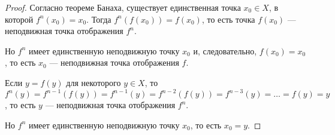 \documentclass[a4paper]{article}
\begin{document}
\begin{proof}
Согласно теореме Банаха, существует единственная точка $x_0 \in X$,
в которой $f^n(x_0) = x_0$. Тогда $f^n(f(x_0)) = f(x_0)$, то есть
точка $f(x_0)$ --- неподвижная точка отображения $f^n$.

Но $f^n$ имеет единственную неподвижную точку $x_0$ и,
следовательно, $f(x_0)=x_0$, то есть $x_0$ --- неподвижная точка
отображения $f$.

Если $y=f(y)$ для некоторого $y\in X$, то $f^n(y) = f^{n-1}(f(y)) =
f^{n-1}(y) = f^{n-2}(f(y)) = f^{n-3}(y) = \ldots = f(y) = y$, то
есть $y$ --- неподвижная точка отображения $f^n$.

Но $f^n$ имеет единственную неподвижную точку $x_0$, то есть
$x_0=y$.
\end{proof}
\end{document}
